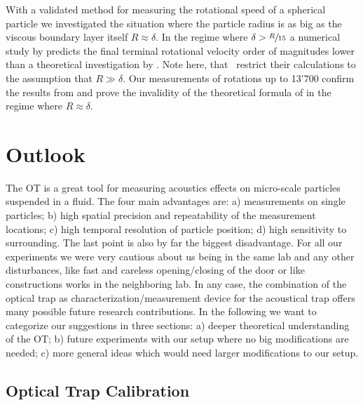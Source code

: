 With a validated method for measuring the rotational speed of a spherical 
particle we investigated the situation where the particle radius is as big as 
the viscous boundary layer itself $R\approx\delta$. In the regime where $\delta 
> \sfrac{R}{15}$ a numerical study by  predicts the final 
terminal rotational velocity order of magnitudes lower than a theoretical 
investigation by . Note here, that~\cite{Lamprecht2015} 
restrict their calculations to the assumption that $R\gg\delta$. Our 
measurements of rotations up to \SI{13'700}{\rpm} confirm the results from 
 and prove the invalidity of the theoretical formula of 
 in the regime where $R\approx\delta$.

\section{Outlook}

The OT is a great tool for measuring acoustics effects on micro-scale particles 
suspended in a fluid. The four main advantages are: a) measurements on single 
particles; b) high spatial precision and repeatability of the measurement 
locations; c) high temporal resolution of particle position; d) high 
sensitivity to surrounding. The last point is also by far the biggest 
disadvantage. For all our experiments we were very cautious about us being in 
the same lab and any other disturbances, like fast and careless opening/closing 
of the door or like constructions works in the neighboring lab. In any case, 
the combination of the optical trap as characterization/measurement device for 
the acoustical trap offers many possible future research contributions. In the 
following we want to categorize our suggestions in three sections: a) deeper 
theoretical understanding of the OT; b) future experiments with our setup where 
no big modifications are needed; c) more general ideas which would need larger 
modifications to our setup.

\subsection{Optical Trap Calibration}

